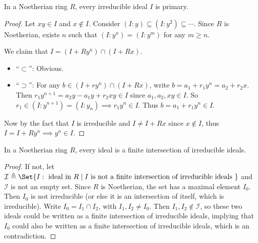 \begin{theorem} \label{thm:noeth-irr-ideal-is-primary}
  In a Noetherian ring $R$, every irreducible ideal $I$ is primary.

  \begin{proof}
    Let $xy \in I$ and $x \not\in I$. Consider $(I : y) \subseteq (I: y^2) \subseteq \dotsm$.
    Since $R$ is Noetherian, exists $n$ such that $(I: y^n) = (I: y^m)$ for any $m \geq n$.

    We claim that $I = (I + Ry^n) \cap (I + Rx)$.
    \begin{itemize}
      \item ``$\subset$'': Obvious.
      \item ``$\supset$'': For any $b \in (I + ry^n) \cap (I + Rx)$,
        write $b = a_1 + r_1 y^{n} = a_2 + r_2 x$. Then
        $r_1 y^{n+1} = a_2 y - a_1 y + r_2 x y \in I$ since $a_1, a_2, xy \in I$.
        So $r_1 \in (I: y^{n+1}) = (I: y_n) \implies r_1 y^n \in I$.
        Thus $b = a_1 + r_1 y^n \in I$.
    \end{itemize}

    Now by the fact that $I$ is irreducible and $I \neq I + Rx$ since $x \not\in I$,
    thus $I = I + Ry^n \implies y^n \in I$.
  \end{proof}
\end{theorem}

\begin{theorem} \label{thm:noeth-ideal-is-finite-intersection}
  In a Noetherian ring $R$, every ideal is a finite intersection of irreducible ideals.

  \begin{proof}
    If not, let $\mathcal{I} \triangleq \Set{I: \text{ ideal in } R \mid I \text{ is not a finite intersection
        of irreducible ideals }}$ and $\mathcal{I}$ is not an empty set.
    Since $R$ is Noetherian, the set has a maximal element $I_0$. Then $I_0$ is not
    irreducible (or else it is an intersection of itself, which is irreducible).
    Write $I_0 = I_1 \cap I_2$, with $I_1, I_2 \neq I_0$. Then $I_1, I_2 \not\in \mathcal{I}$,
    so these two ideals could be written as a finite intersection of irreducible ideals,
    implying that $I_0$ could also be written as a finite intersection of irreducible ideals,
    which is an contradiction.
  \end{proof}
\end{theorem}

